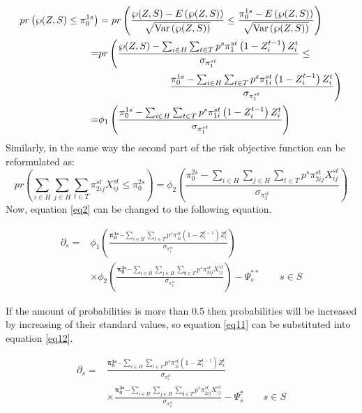 \documentclass[review]{elsarticle}
\begin{document}
\begin{align}
pr\left(\wp (Z,S)\leq \pi _{0}^{1s} \right)&=pr\left(\frac{\wp (Z,S)-E \left(\wp (Z,S)\right)}{\sqrt{{\rm Var}\left(\wp (Z,S)\right)} } \leq \frac{\pi _{0}^{1s}-E \left(\wp (Z,S)\right)}{\sqrt{{\rm Var}\left(\wp (Z,S)\right)} } \right)\label{eq9}\\
= &pr\left(\frac{\wp (Z,S)-\sum _{i\in H}\sum _{t\in T}p^{s} \pi _{1}^{st} \left(1-Z_{i}^{t-1} \right)  Z_{i}^{t} }{\sigma _{{\pi }_{1}^{st} } } \leq\right.\nonumber\\
&\qquad\qquad\qquad\quad \left.\frac{\pi _{0}^{1s} -\sum _{i\in H}\sum _{t\in T}p^{s} \pi _{1i}^{st} \left(1-Z_{i}^{t-1} \right)  Z_{i}^{t} }{\sigma _{{\pi }_{1}^{st} } } \right)\nonumber\\
=&\phi _{1} \left(\frac{\pi _{0}^{1s} -\sum _{i\in H}\sum _{t\in T}p^{s} \pi _{1i}^{st} \left(1-Z_{i}^{t-1} \right)  Z_{i}^{t} }{\sigma _{{\pi }_{1}^{st} } } \right)\nonumber
\end{align}
Similarly, in the same way the second part of the risk objective function can be reformulated as:
\begin{equation}\label{eq10}
pr\left(\sum _{i\in H}\sum _{j\in H}\sum _{t\in T}\pi _{2ij}^{st}    X_{ij}^{st} \le \pi _{0}^{2s} \right)=\phi _{2} \left(\frac{\pi _{0}^{2s} -\sum _{i\in H}\sum _{j\in H}\sum _{t\in T}p^{s} \pi _{2ij}^{st}    X_{ij}^{st} }{\sigma _{{\pi }_{2}^{st} } } \right)
\end{equation}
Now, equation \eqref{eq2} can be changed to the following equation.

\begin{align}\label{eq11}
{\partial }_s=&{\phi }_1\left(\frac{{\mathbf{ \pi }}^{\mathbf{ 1}\mathbf{ s}}_{\mathbf{ 0}}\mathbf{ -}\sum_{i\in H}{\sum_{t\in T}{p^s{\pi }^{st}_{1i}\left(1-Z^{t-1}_i\right)Z^t_i}}}{{\sigma }_{{\pi }^{st}_{1}}}\right)\nonumber\\
&\times\phi_2\left(\frac{{\mathbf{ \pi }}^{\mathbf{ 2}\mathbf{ s}}_{\mathbf{ 0}}\mathbf{ -}\sum_{i\in H}{\sum_{j\in H}{\sum_{\mathbf{ t}\in T}{p^s{\pi }^{st}_{2ij}X^{st}_{ij}}}}}{{\sigma }_{{\pi }^{st}_{2}}}\right)-{\Psi }^{**}_s\qquad s\in S
\end{align}

If the amount of probabilities is more than 0.5 then probabilities will be increased by increasing of their standard values, so equation \eqref{eq11} can be substituted into equation \eqref{eq12}.

\begin{align}\label{eq12}
{\partial }_s=&\frac{{\mathbf{ \pi }}^{\mathbf{ 1}\mathbf{ s}}_{\mathbf{ 0}}\mathbf{ -}\sum_{i\in H}{\sum_{t\in T}{p^s{\pi }^{st}_{1i}(1-Z^{t-1}_i)Z^t_i}}}{{\sigma }_{{\pi }^{st}_{1}}}\nonumber\\
&\mathbf{ \times }\frac{{\mathbf{ \pi }}^{\mathbf{ 2}\mathbf{ s}}_{\mathbf{ 0}}\mathbf{ -}\sum_{i\in H}{\sum_{j\in H}{\sum_{\mathbf{ t}\in T}{p^s{\pi }^{st}_{2ij}X^{st}_{ij}}}}}{{\sigma }_{{\pi }^{st}_{2}}}-{\Psi }^*_s\qquad s\in S
\end{align}
\end{document}
